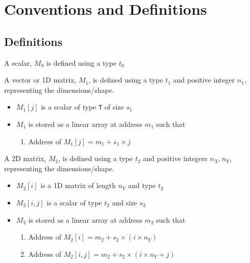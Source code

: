 \section{Conventions and Definitions}
\subsection{Definitions}

\begin{definition}
  \label{scalar}
  A scalar, \(M_0\) is defined using a type \(t_0\)
\end{definition}

\begin{definition}
  \label{1D_matrix}
  A vector or 1D matrix, \(M_1\), is defined using a type \(t_1\) and positive integer
\(n_1\), representing the dimensions/shape.
\begin{itemize}
  \item \(M_1[j]\) is a scalar of type {\tt T} of size \(s_1\)
\item \(M_1\) is stored as a linear array at address \(m_1\)
  such that 
    \begin{enumerate} 
\item Address of \(M_1[j]  = m_1 + s_1 \times j\)
\end{enumerate}
\end{itemize}
\end{definition}

\begin{definition}
  \label{2D_matrix}
  A 2D matrix, \(M_2\),  is defined using a type \(t_2\) and positive integers 
\(n_X, n_Y\), representing the dimensions/shape.
\begin{itemize}
  \item \(M_2[i]\) is a 1D matrix of length \(n_Y\) and type \(t_2\)
  \item \(M_2[i, j]\) is a scalar of type \(t_2\) and size \(s_2\)
  \item \(M_2\) is stored as a linear array at address \(m_2\)
  such that 
    \begin{enumerate} 
      \item Address of \(M_2[i] = m_2 + s_2 \times (i \times n_Y)\)
      \item Address of \(M_2[i, j] = m_2 + 
        s_2 \times (i \times n_Y + j)\)
\end{enumerate}
\end{itemize}
\end{definition}


